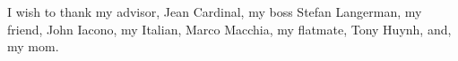 
I wish to thank my advisor, Jean Cardinal, my boss Stefan Langerman, my friend,
John Iacono, my Italian, Marco Macchia, my flatmate, Tony Huynh, and, my mom.
